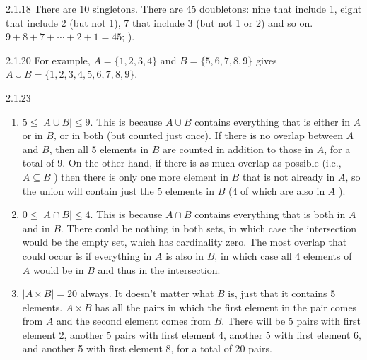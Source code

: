\documentclass[11pt,]{book}
\theoremstyle{ptxplainnotitle}
\theoremstyle{ptxplaintitle}
\theoremstyle{ptxdefinitionnotitle}
\theoremstyle{ptxdefinitiontitle}
\theoremstyle{ptxdefinitionnotitle}
\theoremstyle{ptxdefinitiontitle}
\theoremstyle{ptxdefinitionnotitle}
\theoremstyle{ptxdefinitiontitle}
\theoremstyle{ptxdefinitiontitlenonumber}
\theoremstyle{ptxdefinitiontitlenonumber}
\numberwithin{equation}{chapter}
\begin{document}
\begin{divisionexercise}{2.1.18}
\textbf{}\hypertarget{p-951}{}%
There are 10 singletons. There are 45 doubletons: nine that include 1, eight that include 2 (but not 1), 7 that include 3 (but not 1 or 2) and so on. \(9+8+7+\cdots+2+1 = 45\text{;}\) ).%
\end{divisionexercise}%
\begin{divisionexercise}{2.1.20}
\textbf{}\hypertarget{p-954}{}%
For example, \(A = \{1,2,3,4\}\) and \(B = \{5,6,7,8,9\}\) gives \(A \cup B = \{1,2,3,4,5,6,7,8,9\}\).%
\end{divisionexercise}%
\begin{divisionexercise}{2.1.23}
\textbf{}\hypertarget{p-969}{}%
\leavevmode%
\begin{enumerate}[label=(\alph*)]
\item\hypertarget{li-434}{}\hypertarget{p-970}{}%
\(5 \le |A\cup B| \le 9\text{.}\)  This is because \(A \cup B\) contains everything that is either in \(A\) or in \(B\text{,}\) or in both (but counted just once).  If there is no overlap between \(A\) and \(B\text{,}\) then all 5 elements in \(B\) are counted in addition to those in \(A\text{,}\) for a total of 9. On the other hand, if there is as much overlap as possible (i.e., \(A \subseteq B\) ) then there is only one more element in \(B\) that is not already in \(A\text{,}\) so the union will contain just the 5 elements in \(B\) (4 of which are also in \(A\) ).%
\item\hypertarget{li-435}{}\hypertarget{p-971}{}%
\(0 \le |A \cap B| \le 4\text{.}\)  This is because \(A \cap B\) contains everything that is both in \(A\) and in \(B\text{.}\)  There could be nothing in both sets, in which case the intersection would be the empty set, which has cardinality zero.  The most overlap that could occur is if everything in \(A\) is also in \(B\text{,}\) in which case all 4 elements of \(A\) would be in \(B\) and thus in the intersection.%
\item\hypertarget{li-436}{}\hypertarget{p-972}{}%
\(|A \times B| = 20\) always.  It doesn't matter what \(B\) is, just that it contains 5 elements. \(A \times B\) has all the pairs in which the first element in the pair comes from \(A\) and the second element comes from \(B\text{.}\)  There will be 5 pairs with first element 2, another 5 pairs with first element 4, another 5 with first element 6, and another 5 with first element 8, for a total of 20 pairs.%
\end{enumerate}
%
\end{divisionexercise}%
\end{document}
